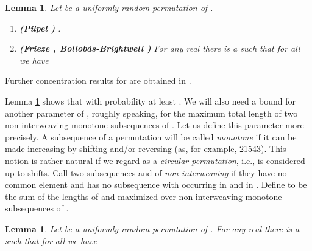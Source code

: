 \documentclass[reqno,12pt]{amsart}
\newtheorem{lemma}[theorem]{Lemma}
\newenvironment{bfenumerate}{\renewcommand{\labelenumi}{{\bf\theenumi.}}\renewcommand{\labelenumii}{{\bf(\theenumii)}}\begin{enumerate}}{\end{enumerate}}
\begin{document}
\begin{lemma}\label{lem:random}
Let  be a uniformly random permutation of .

\noindent
\begin{bfenumerate}
\item \textbf{(Pilpel \cite{Pil})}
.

\smallskip

\item \textbf{(Frieze \cite{Fri}, Bollob\'as-Brightwell \cite{BBr})}
For any real  there is a  such that
for all  we have

\end{bfenumerate}
\end{lemma}

\noindent
Further concentration results for  are obtained in \cite{Tal,BDJ}.

Lemma \ref{lem:random} shows that 
with probability at least .
We will also need a bound for another parameter of , roughly speaking, for
the maximum total length of two non-interweaving monotone subsequences of .
Let us define this parameter more precisely.
A subsequence of a permutation  will be called \emph{monotone} if it can 
be made increasing by shifting and/or reversing (as, for example, 21543). 
This notion is rather natural if we regard  as a \emph{circular permutation}, 
i.e.,  is considered up to shifts.
Call two subsequences  and  of  
\emph{non-interweaving} if they have no common element and  has no 
subsequence  with  occurring in  
and  in . Define  to be the sum of 
the lengths of  and  maximized over non-interweaving monotone 
subsequences of .

\begin{lemma}\label{lem:random2}
Let  be a uniformly random permutation of . 
For any real  there is a  such that
for all  we have

\end{lemma}
\end{document}
